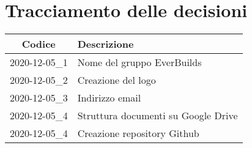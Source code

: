\section*{Tracciamento delle decisioni}

\begin{center}
	\begin{longtable}{|c|p{12.25cm}|}
	\hline
	\rowcolor{lighter-grayer}
	\textbf{Codice} & \textbf{Descrizione} \\
	\hline
	\endfirsthead

	\hline
	2020-12-05\_1 & Nome del gruppo EverBuilds\\
	\hline
	2020-12-05\_2 & Creazione del logo\\
	\hline
	2020-12-05\_3 & Indirizzo email\\
	\hline
	2020-12-05\_4 & Struttura documenti su Google Drive\\
	\hline
	2020-12-05\_4 & Creazione repository Github\\
	\hline
	\end{longtable}
\end{center}
